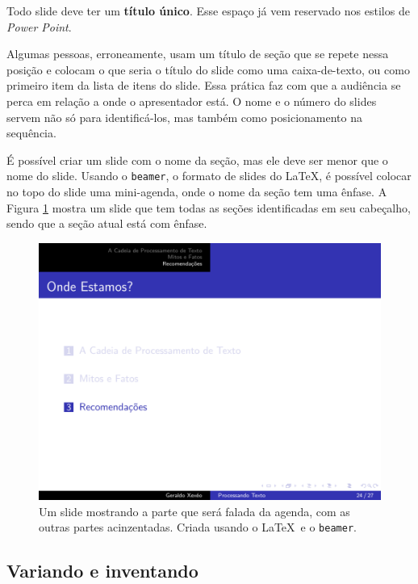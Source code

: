 Todo slide deve ter um \textbf{título único}. Esse espaço já vem reservado nos estilos de \textit{Power Point}.

Algumas pessoas, erroneamente, usam um título de seção que se repete nessa posição e colocam o que seria o título do slide como uma caixa-de-texto, ou como primeiro item da lista de itens do slide. Essa prática faz com que a audiência se perca em relação a onde o apresentador está. O nome e o número do slides servem não só para identificá-los, mas também como posicionamento na sequência.

É possível criar um slide com o nome da seção, mas ele deve ser menor que o nome do slide. Usando o \texttt{beamer}, o formato de slides do \LaTeX, é possível colocar no topo do slide uma mini-agenda, onde o nome da seção tem uma ênfase. A Figura \ref{fig:meio} mostra um slide que tem todas as seções identificadas em seu cabeçalho, sendo que a seção atual está com ênfase.

\begin{figure}[hb]
    \centering
    \includegraphics[width=\tam\linewidth]{imagens/agendadomeio.png}
    \caption{Um slide mostrando a parte que será falada da agenda, com as outras partes acinzentadas. Criada usando o \LaTeX\  e o \texttt{beamer}.}
    \label{fig:meio}
\end{figure}



\subsection{Variando e inventando}


